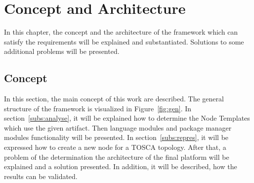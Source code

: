 
\chapter{Concept and Architecture}\label{chap:conarch}
In this chapter, the concept and the architecture of the framework which can satisfy the requirements will be explained and substantiated.
Solutions to some additional problems will be presented. 
\section{Concept}
In this section, the main concept of this work are described.
The general structure of the framework is visualized in Figure~\ref{fig:gen}. 
In section~\ref{subs:analyse}, it will be explained how to determine the Node Templates which use the given artifact.
Then language modules and package manager modules functionality will be presented.
In section~\ref{subs:repres}, it will be expressed how to create a new node for a TOSCA topology. 
After that, a problem of the determination the architecture of the final platform will be explained and a solution presented.
In addition, it will be described, how the results can be validated.



